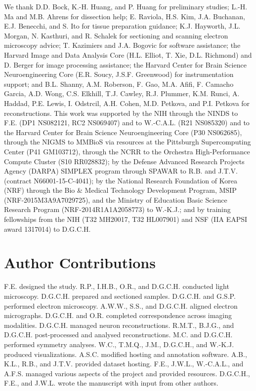 \documentclass{article}
\begin{document}
We thank D.D. Bock, K.-H. Huang, and P. Huang for preliminary studies; L.-H. Ma and M.B. Ahrens for dissection help; E. Raviola, H.S. Kim, J.A. Buchanan, E.J. Benecchi, and S. Ito for tissue preparation guidance; K.J. Hayworth, J.L. Morgan, N. Kasthuri, and R. Schalek for sectioning and scanning electron microscopy advice; T. Kazimiers and J.A. Bogovic for software assistance; the Harvard Image and Data Analysis Core (H.L. Elliot, T. Xie, D.L. Richmond) and D. Berger for image processing assistance; the Harvard Center for Brain Science Neuroengineering Core (E.R. Soucy, J.S.F. Greenwood) for instrumentation support; and B.L. Shanny, A.M. Roberson, F. Gao, M.A. Afifi, F. Camacho Garcia, A.D. Wong, C.S. Elkhill, T.J. Cawley, R.J. Plummer, K.M. Runci, A. Haddad, P.E. Lewis, I. Odstrcil, A.H. Cohen, M.D. Petkova, and P.I. Petkova for reconstructions. This work was supported by the NIH through the NINDS to F.E. (DP1 NS082121, RC2 NS069407) and to W.-C.A.L. (R21 NS085320) and to the Harvard Center for Brain Science Neuroengineering Core (P30 NS062685), through the NIGMS to MMBioS via resources at the Pittsburgh Supercomputing Center (P41 GM103712), through the NCRR to the Orchestra High-Performance Compute Cluster (S10 RR028832); by the Defense Advanced Research Projects Agency (DARPA) SIMPLEX program through SPAWAR to R.B. and J.T.V. (contract N66001-15-C-4041); by the National Research Foundation of Korea (NRF) through the Bio \& Medical Technology Development Program, MSIP (NRF-2015M3A9A7029725), and the Ministry of Education Basic Science Research Program (NRF-2014R1A1A2058773) to W.-K.J.; and by training fellowships from the NIH (T32 MH20017, T32 HL007901) and NSF (IIA EAPSI award 1317014) to D.G.C.H.


\section*{Author Contributions}

F.E. designed the study. R.P., I.H.B., O.R., and D.G.C.H. conducted light microscopy. D.G.C.H. prepared and sectioned samples. D.G.C.H. and G.S.P. performed electron microscopy. A.W.W., S.S., and D.G.C.H. aligned electron micrographs. D.G.C.H. and O.R. completed correspondence across imaging modalities. D.G.C.H. managed neuron reconstructions. R.M.T., B.J.G., and D.G.C.H. post-processed and analysed reconstructions. M.C. and D.G.C.H. performed symmetry analyses. W.C., T.M.Q., J.M., D.G.C.H., and W.-K.J. produced visualizations. A.S.C. modified hosting and annotation software. A.B., K.L., R.B., and J.T.V. provided dataset hosting. F.E., J.W.L., W.-C.A.L., and A.F.S. managed various aspects of the project and provided resources. D.G.C.H., F.E., and J.W.L. wrote the manuscript with input from other authors.
\end{document}
